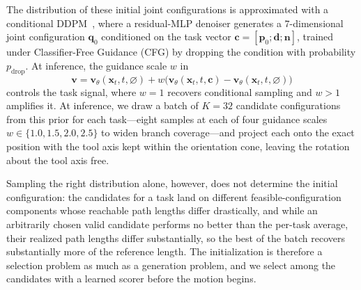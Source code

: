 \documentclass[journal, twoside]{IEEEtran}
\begin{document}
The distribution of these initial joint configurations is approximated with a conditional DDPM~\cite{ho2020denoising}, where a residual-MLP denoiser generates a $7$-dimensional joint configuration $\mathbf{q}_{0}$ conditioned on the task vector $\mathbf{c}=[\mathbf{p}_{0};\mathbf{d};\mathbf{n}]$, trained under Classifier-Free Guidance (CFG) \cite{ho2022classifier} by dropping the condition with probability $p_{\mathrm{drop}}$. At inference, the guidance scale $w$ in
\begin{equation}
\label{eq:cfg}
\mathbf{v} = \mathbf{v}_{\theta}(\mathbf{x}_{t},t,\varnothing) + w\big(\mathbf{v}_{\theta}(\mathbf{x}_{t},t,\mathbf{c}) - \mathbf{v}_{\theta}(\mathbf{x}_{t},t,\varnothing)\big)
\end{equation}
controls the task signal, where $w=1$ recovers conditional sampling and $w>1$ amplifies it. At inference, we draw a batch of $K{=}32$ candidate configurations from this prior for each task---eight samples at each of four guidance scales $w\in\{1.0,1.5,2.0,2.5\}$ to widen branch coverage---and project each onto the exact position with the tool axis kept within the orientation cone, leaving the rotation about the tool axis free.

Sampling the right distribution alone, however, does not determine the initial configuration: the candidates for a task land on different feasible-configuration components whose reachable path lengths differ drastically, and while an arbitrarily chosen valid candidate performs no better than the per-task average, their realized path lengths differ substantially, so the best of the batch recovers substantially more of the reference length. The initialization is therefore a selection problem as much as a generation problem, and we select among the candidates with a learned scorer before the motion begins.
\end{document}

